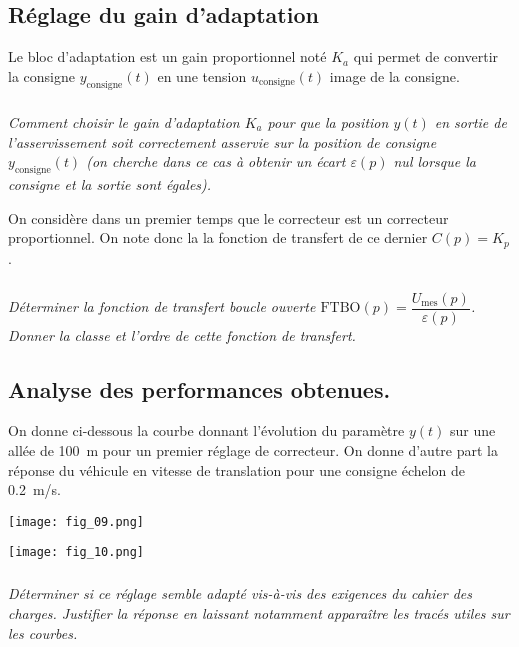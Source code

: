 \begin{multicols}{2}
\subsection*{Réglage du gain d’adaptation}

Le bloc d’adaptation est un gain proportionnel noté $K_a$ qui permet de convertir la consigne $y_{\text{consigne}}(t)$ en une tension $u_{\text{consigne}}(t)$ image de la consigne.  



\subparagraph{}
\textit{Comment choisir le gain d’adaptation $K_a$ pour que la position $y(t)$ en sortie de l’asservissement soit correctement asservie sur la position de consigne $y_{\text{consigne}} (t)$ (on cherche dans ce cas à obtenir un écart $\varepsilon(p)$ nul lorsque la consigne et la sortie sont égales).}
\ifprof
\begin{corrige}
\end{corrige}
\else
\fi

On considère dans un premier temps que le correcteur est un correcteur proportionnel. On note donc la la fonction de transfert de ce dernier $C(p) = K_p$.


\subparagraph{}
\textit{Déterminer la fonction de transfert boucle ouverte $\text{FTBO}(p)=\dfrac{U_{\text{mes}} (p)}{\varepsilon(p)}$.
Donner la classe et l’ordre de cette fonction de transfert. }
\ifprof
\begin{corrige}
\end{corrige}
\else
\fi

\subsection*{Analyse des performances obtenues.}

On donne ci-dessous la courbe donnant l’évolution du paramètre $y(t)$ sur une allée de \SI{100}{m} pour un premier réglage de correcteur. On donne d’autre part la réponse du véhicule en vitesse de translation pour une consigne échelon de \SI{0,2}{m/s}. 

\begin{center}
\texttt{[image: fig\_09.png]}
\end{center}


\begin{center}
\texttt{[image: fig\_10.png]}
\end{center}

\subparagraph{}
\textit{Déterminer si ce réglage semble adapté vis-à-vis des exigences du cahier des charges. Justifier la réponse en laissant notamment apparaître les tracés utiles sur les courbes. }
\ifprof
\begin{corrige}
\end{corrige}
\else
\fi

\end{multicols}
